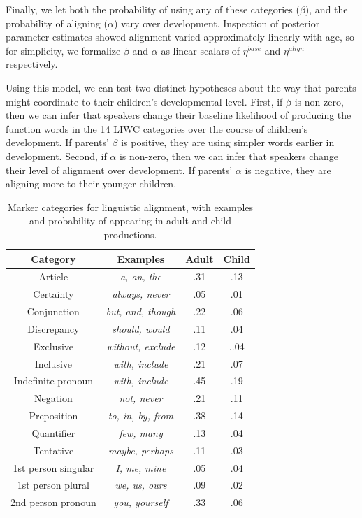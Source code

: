 \documentclass[10pt,letterpaper]{article}
\begin{document}
Finally, we let both the probability of using any of these categories ($\beta$), and the probability of aligning ($\alpha$) vary over development. Inspection of posterior parameter estimates showed alignment varied approximately linearly with age, so for simplicity, we formalize $\beta$ and $\alpha$ as linear scalars of $\eta^{base}$ and $\eta^{align}$ respectively.


Using this model, we can test two distinct hypotheses about the way that parents might coordinate to their children's developmental level. First, if $\beta$ is non-zero, then we can infer that speakers change their baseline likelihood of producing the function words in the 14 LIWC categories over the course of children's development. If parents' $\beta$ is positive, they are using simpler words earlier in development. Second, if $\alpha$ is non-zero, then we can infer that speakers change their level of alignment over development. If parents' $\alpha$ is negative, they are aligning more to their younger children.

\begin{table}[tb]
\centering
\begin{tabular}{|c|c|c|c|} \hline
Category & Examples & Adult & Child\\ \hline
Article & \textit{a, an, the} & .31 & .13 \\
Certainty  & \textit{always, never} & .05 & .01 \\
Conjunction  & \textit{but, and, though} & .22 & .06\\
Discrepancy  & \textit{should, would} & .11 & .04 \\
Exclusive  & \textit{without, exclude} & .12 & ..04\\
Inclusive  & \textit{with, include} & .21 & .07\\
Indefinite pronoun & \textit{with, include} & .45 & .19\\
Negation   & \textit{not, never} & .21 & .11\\
Preposition& \textit{to, in, by, from}  & .38 & .14\\
Quantifier   & \textit{few, many} & .13 & .04\\
Tentative & \textit{maybe, perhaps} & .11 & .03\\
1st person singular  & \textit{I, me, mine} & .05 & .04\\
1st person plural & \textit{we, us, ours} & .09 & .02\\
2nd person pronoun   & \textit{you, yourself} & .33 & .06\\
\hline
\end{tabular}
\caption{Marker categories for linguistic alignment, with examples and probability of appearing in adult and child productions.}\label{tab:LIWC}
\end{table}
\end{document}
